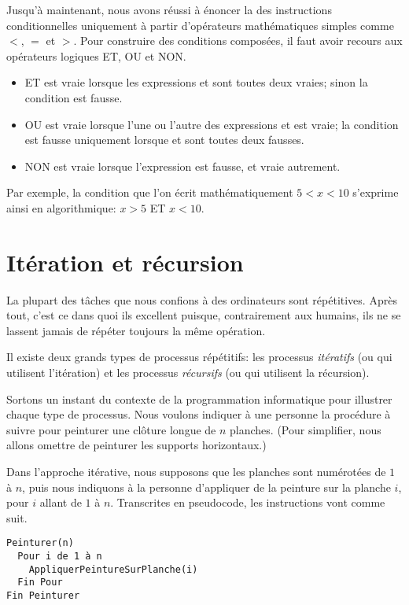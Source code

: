Jusqu'à maintenant, nous avons réussi à énoncer la 
des instructions conditionnelles uniquement à partir d'opérateurs
mathématiques simples comme $<$, $=$ et $>$. Pour construire des
conditions composées, il faut avoir recours aux opérateurs logiques
ET, OU et NON.
\begin{itemize}
\item {} ET  est vraie lorsque les expressions
   et  sont toutes deux vraies; sinon la
  condition est fausse.
\item {} OU  est vraie lorsque l'une ou l'autre
  des expressions  et  est vraie; la condition
  est fausse uniquement lorsque  et  sont
  toutes deux fausses.
\item NON  est vraie lorsque l'expression  est fausse,
  et vraie autrement.
\end{itemize}

Par exemple, la condition que l'on écrit mathématiquement $5 < x < 10$
s'exprime ainsi en algorithmique: $x > 5$ ET $x < 10$.


\section{Itération et récursion}
\label{sec:algorithmes:iteration}

La plupart des tâches que nous confions à des ordinateurs sont
répétitives. Après tout, c'est ce dans quoi ils excellent puisque,
contrairement aux humains, ils ne se lassent jamais de répéter
toujours la même opération.

Il existe deux grands types de processus répétitifs: les processus
\emph{itératifs} (ou qui utilisent
l'itération) et les processus
\emph{récursifs} (ou qui utilisent la
récursion).

Sortons un instant du contexte de la programmation informatique pour
illustrer chaque type de processus. Nous voulons indiquer à une
personne la procédure à suivre pour peinturer une clôture longue de
$n$ planches. (Pour simplifier, nous allons omettre de peinturer les
supports horizontaux.)

Dans l'approche itérative, nous supposons que les planches sont
numérotées de $1$ à $n$, puis nous indiquons à la personne d'appliquer
de la peinture sur la planche $i$, pour $i$ allant de $1$ à $n$.
Transcrites en pseudocode, les instructions vont comme suit.
\begin{Schunk}
\begin{Verbatim}
Peinturer(n)
  Pour i de 1 à n
    AppliquerPeintureSurPlanche(i)
  Fin Pour
Fin Peinturer
\end{Verbatim}
\end{Schunk}

